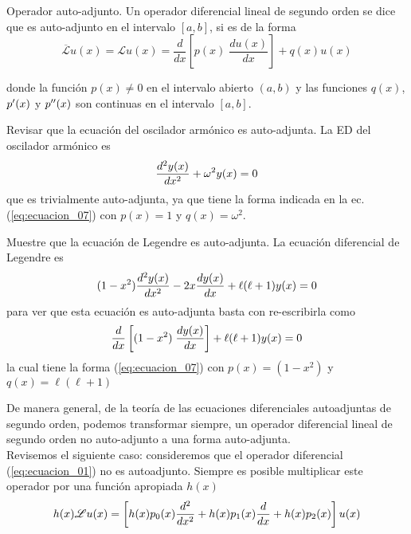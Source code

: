\begin{defi}{Operador auto-adjunto.}
Un operador diferencial lineal de segundo orden se dice que es auto-adjunto en el intervalo $[a,b]$, si es de la forma
\begin{equation}
\overline{\mathscr{L}} u(x) = \mathscr{L} u(x) =  \dfrac{d}{dx} \left[ p(x) \; \dfrac{d u(x)}{dx} \right] + q(x) u(x)
\label{eq:ecuacion_07}
\end{equation}
\end{defi}
donde la función $p(x) \neq 0$ en el intervalo abierto $(a,b)$ y las funciones $q(x)$, $p^{\prime} (x)$ y $p^{\prime \prime}(x)$ son continuas en el intervalo $[a,b]$.
\begin{ejemplo}{Revisar que la ecuación del oscilador armónico es auto-adjunta.}
La ED del oscilador armónico es
\begin{equation}
\dfrac{d^{2} y(x)}{d x^{2}} + \omega^{2} y(x) = 0
\label{eq:ecuacion_08}
\end{equation}
que es trivialmente auto-adjunta, ya que tiene la forma indicada en la ec. (\ref{eq:ecuacion_07}) con $p(x) = 1$ y $q(x) = \omega^{2}$.
\end{ejemplo}
\begin{ejemplo}{Muestre que la ecuación de Legendre es auto-adjunta.}
La ecuación diferencial de Legendre es
\begin{equation}
(1 - x^{2}) \dfrac{d^{2} y(x)}{d x^{2}} - 2x \dfrac{d {y(x)}}{d x} + \ell(\ell + 1) y(x) = 0
\label{eq:ecuacion_09}
\end{equation}
para ver que esta ecuación es auto-adjunta basta con re-escribirla como
\begin{equation}
\dfrac{d {}}{d x} \left[ (1 - x^{2}) \; \dfrac{d {y(x)}}{d x} \right] + \ell (\ell + 1) y(x) = 0
\label{eq:ecuacion_10}
\end{equation}
la cual tiene la forma (\ref{eq:ecuacion_07}) con $p(x)=(1 - x^{2})$ y $q(x) = \ell ( \ell + 1)$
\end{ejemplo}
De manera general, de la teoría de las ecuaciones diferenciales autoadjuntas de segundo orden, podemos transformar siempre, un operador diferencial lineal de segundo orden no auto-adjunto a una forma auto-adjunta.
\\
Revisemos el siguiente caso: consideremos que el operador diferencial (\ref{eq:ecuacion_01}) no es autoadjunto. Siempre es posible multiplicar este operador por una función apropiada $h(x)$
\begin{equation}
h(x) \mathscr{L} u(x) = \left[ h(x) p_{0}(x) \dfrac{d^{2} }{d x^{2}} + h(x) p_{1}(x) \dfrac{d {}}{d x} + h(x) p_{2}(x) \right] u(x)
\label{eq:ecuacion_11}
\end{equation}
